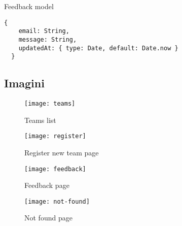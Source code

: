 Feedback model
\begin{lstlisting}
{
    email: String,
    message: String,
    updatedAt: { type: Date, default: Date.now }
  }
  \end{lstlisting}

\break
\subsection{Imagini}

\begin{center}
	\begin{figure}[h]
		\centering
		\texttt{[image: teams]}\\
		\caption{Teams list}
		\label{run}
	\end{figure}
	
	\begin{figure}[h]
		\centering
		\texttt{[image: register]}\\
		\caption{Register new team page}
		\label{jump}
	\end{figure}
	
	\begin{figure}[h]
		\centering
		\texttt{[image: feedback]}\\
		\caption{Feedback page}
		\label{slide}
	\end{figure}
	
	\begin{figure}[h]
		\centering
		\texttt{[image: not-found]}\\
		\caption{Not found page}
		\label{lose}
	\end{figure}
\end{center}

\clearpage